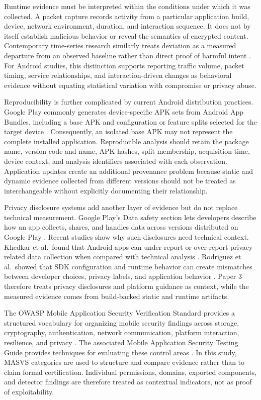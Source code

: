 Runtime evidence must be interpreted within the conditions under which it was collected. A packet capture records activity from a particular application build, device, network environment, duration, and interaction sequence. It does not by itself establish malicious behavior or reveal the semantics of encrypted content. Contemporary time-series research similarly treats deviation as a measured departure from an observed baseline rather than direct proof of harmful intent \cite{mejri2024timeseries}. For Android studies, this distinction supports reporting traffic volume, packet timing, service relationships, and interaction-driven changes as behavioral evidence without equating statistical variation with compromise or privacy abuse.

Reproducibility is further complicated by current Android distribution practices. Google Play commonly generates device-specific APK sets from Android App Bundles, including a base APK and configuration or feature splits selected for the target device \cite{androidAppBundles2026}. Consequently, an isolated base APK may not represent the complete installed application. Reproducible analysis should retain the package name, version code and name, APK hashes, split membership, acquisition time, device context, and analysis identifiers associated with each observation. Application updates create an additional provenance problem because static and dynamic evidence collected from different versions should not be treated as interchangeable without explicitly documenting their relationship.

Privacy disclosure systems add another layer of evidence but do not replace technical measurement. Google Play's Data safety section lets developers describe how an app collects, shares, and handles data across versions distributed on Google Play \cite{googlePlayDataSafety2026}. Recent studies show why such disclosures need technical context. Khedkar et al.\ found that Android apps can under-report or over-report privacy-related data collection when compared with technical analysis \cite{khedkar2026privacydata}. Rodriguez et al.\ showed that SDK configuration and runtime behavior can create mismatches between developer choices, privacy labels, and application behavior \cite{rodriguez2025privacysettings}. Paper 3 therefore treats privacy disclosures and platform guidance as context, while the measured evidence comes from build-backed static and runtime artifacts.

The OWASP Mobile Application Security Verification Standard provides a structured vocabulary for organizing mobile security findings across storage, cryptography, authentication, network communication, platform interaction, resilience, and privacy \cite{owaspMasvs2024}. The associated Mobile Application Security Testing Guide provides techniques for evaluating these control areas \cite{owaspMastg2024}. In this study, MASVS categories are used to structure and compare evidence rather than to claim formal certification. Individual permissions, domains, exported components, and detector findings are therefore treated as contextual indicators, not as proof of exploitability.

